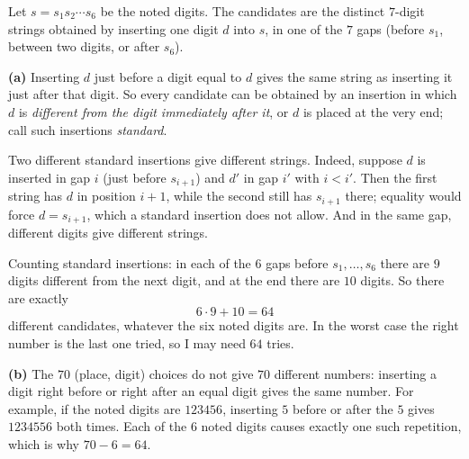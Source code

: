 Let $s=s_1s_2\cdots s_6$ be the noted digits. The candidates are the distinct $7$-digit strings obtained by inserting one digit $d$ into $s$, in one of the $7$ gaps (before $s_1$, between two digits, or after $s_6$).

\textbf{(a)} Inserting $d$ just before a digit equal to $d$ gives the same string as inserting it just after that digit. So every candidate can be obtained by an insertion in which $d$ is \emph{different from the digit immediately after it}, or $d$ is placed at the very end; call such insertions \emph{standard}.

Two different standard insertions give different strings. Indeed, suppose $d$ is inserted in gap $i$ (just before $s_{i+1}$) and $d'$ in gap $i'$ with $i<i'$. Then the first string has $d$ in position $i+1$, while the second still has $s_{i+1}$ there; equality would force $d=s_{i+1}$, which a standard insertion does not allow. And in the same gap, different digits give different strings.

Counting standard insertions: in each of the $6$ gaps before $s_1,\dots,s_6$ there are $9$ digits different from the next digit, and at the end there are $10$ digits. So there are exactly
\[6\cdot9+10=64\]
different candidates, whatever the six noted digits are. In the worst case the right number is the last one tried, so I may need $\boxed{64}$ tries.

\textbf{(b)} The $70$ (place, digit) choices do not give $70$ different numbers: inserting a digit right before or right after an equal digit gives the same number. For example, if the noted digits are $123456$, inserting $5$ before or after the $5$ gives $1234556$ both times. Each of the $6$ noted digits causes exactly one such repetition, which is why $70-6=64$.
